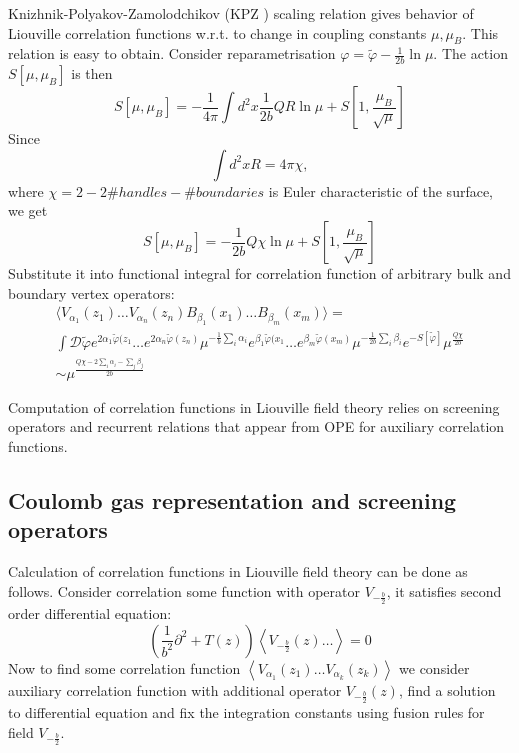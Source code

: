 \documentclass[12pt]{article}
\begin{document}
Knizhnik-Polyakov-Zamolodchikov (KPZ \cite{knizhnik1988fractal}) scaling relation gives behavior of
Liouville correlation functions w.r.t. to change in coupling constants $\mu, \mu_{B}$. This relation
is easy to obtain. Consider reparametrisation $\varphi=\tilde\varphi-\frac{1}{2b}\ln\mu$. The action
$S[\mu,\mu_{B}]$ is then
\begin{equation}
  \label{eq:84}
  S[\mu,\mu_{B}]=-\frac{1}{4\pi}\int d^{2}x \frac{1}{2b}QR\ln\mu+S\left[1,\frac{\mu_{B}}{\sqrt{\mu}}\right]
\end{equation}
Since
\begin{equation}
  \label{eq:85}
  \int d^{2}x R =4\pi\chi,
\end{equation}
where $\chi=2-2\#handles-\#boundaries$ is Euler characteristic of the surface, we get
\begin{equation}
  \label{eq:99}
    S[\mu,\mu_{B}]=-\frac{1}{2b}Q\chi\ln\mu+S\left[1,\frac{\mu_{B}}{\sqrt{\mu}}\right]
\end{equation}
Substitute it into functional integral for correlation function of arbitrary bulk and boundary
vertex operators:
\begin{multline}
  \label{eq:100}
  \langle V_{\alpha_{1}}(z_{1})\dots V_{\alpha_{n}}(z_{n}) B_{\beta_{1}}(x_{1})\dots
  B_{\beta_{m}}(x_{m})\rangle=\\
  \int \mathcal{D}\tilde\varphi e^{2\alpha_{1}\tilde\varphi(z_{1}}\dots
  e^{2\alpha_{n}\tilde\varphi(z_{n})} \mu^{-\frac{1}{b} \sum_{i}\alpha_{i}} 
  e^{\beta_{1}\tilde\varphi(x_{1}}\dots
  e^{\beta_{m}\tilde\varphi(x_{m})} \mu^{-\frac{1}{2b} \sum_{i}\beta_{i}} e^{-S[\tilde\varphi]}
  \mu^{\frac{Q\chi}{2b}}\\
  \sim \mu^{\frac{Q\chi-2\sum_{i}\alpha_{i}-\sum_{j}\beta_{j}}{2b}}
\end{multline}



Computation of correlation functions in Liouville field theory relies on screening operators and
recurrent relations that appear from OPE for auxiliary correlation functions.
\subsection{Coulomb gas representation and screening operators}
\label{sec:coul-gas-repr}

Calculation of correlation functions in Liouville field theory can be done as follows. 
Consider correlation some function with operator $V_{-\frac{b}{2}}$, it satisfies second order
differential equation:
\begin{equation}
  \label{eq:33}
  \left(\frac{1}{b^{2}}\partial^{2}+T(z)\right)\left<V_{-\frac{b}{2}}(z) \dots \right>=0
\end{equation}
Now to find some correlation function $\left<V_{\alpha_{1}}(z_{1})\dots
  V_{\alpha_{k}}(z_{k})\right>$ we consider auxiliary correlation function with additional
operator $V_{-\frac{b}{2}}(z)$, find a solution to differential equation and fix the integration
constants using fusion rules for field $V_{-\frac{b}{2}}$.
\end{document}
